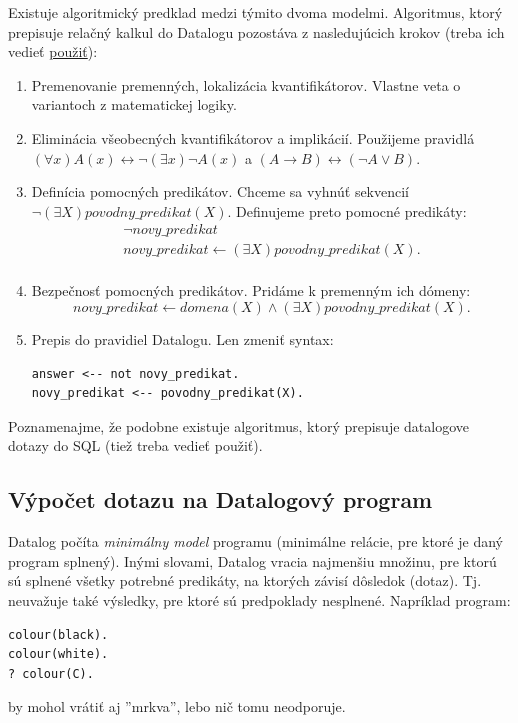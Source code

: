 \documentclass[10pt,a4paper]{article}
\begin{document}
Existuje algoritmický predklad medzi týmito dvoma modelmi.
Algoritmus, ktorý prepisuje relačný kalkul do Datalogu pozostáva z nasledujúcich krokov (treba ich vedieť \underline{použiť}):

\begin{enumerate}
\item Premenovanie premenných, lokalizácia kvantifikátorov. Vlastne veta o variantoch z matematickej logiky. 

\item Eliminácia všeobecných kvantifikátorov a implikácií. Použijeme pravidlá $(\forall x)A(x) \leftrightarrow \neg (\exists x) \neg A(x)$ a $(A \rightarrow B) \leftrightarrow (\neg A \vee B)$.

\item Definícia pomocných predikátov. Chceme sa vyhnúť sekvencií $\neg (\exists X) povodny\_predikat(X)$. Definujeme preto pomocné predikáty: 
$$
\begin{array}{l}
\neg novy\_predikat \\
novy\_predikat \leftarrow (\exists X) povodny\_predikat(X).\\
\end{array} 
$$

\item Bezpečnosť pomocných predikátov. Pridáme k premenným ich dómeny:
$$
novy\_predikat \leftarrow domena(X) \wedge (\exists X) povodny\_predikat(X).
$$

\item Prepis do pravidiel Datalogu. Len zmeniť syntax:
\begin{verbatim}
answer <-- not novy_predikat.
novy_predikat <-- povodny_predikat(X).
\end{verbatim}

\end{enumerate}

Poznamenajme, že podobne existuje algoritmus, ktorý prepisuje datalogove dotazy do SQL (tiež treba vedieť použiť). 

\subsection{Výpočet dotazu na Datalogový program}

Datalog počíta \emph{minimálny model} programu (minimálne relácie, pre ktoré je daný program splnený). Inými slovami, Datalog vracia najmenšiu množinu, pre ktorú sú splnené všetky potrebné predikáty, na ktorých závisí dôsledok (dotaz). Tj. neuvažuje také výsledky, pre ktoré sú predpoklady nesplnené. Napríklad program: 
\begin{verbatim}
colour(black).
colour(white).
? colour(C).
\end{verbatim}
by mohol vrátiť aj ''mrkva'', lebo nič tomu neodporuje.
\end{document}
